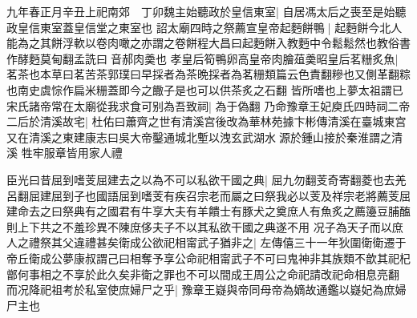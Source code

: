 九年春正月辛丑上祀南郊　丁卯魏主始聽政於皇信東室|{
	自居馮太后之喪至是始聽政皇信東室蓋皇信堂之東室也}
詔太廟四時之祭薦宣皇帝起麪餅鴨|{
	起麪餅今北人能為之其餅浮軟以卷肉噉之亦謂之卷餅程大昌曰起麪餅入教麪中令鬆鬆然也教俗書作酵麪莫甸翻孟詵曰音郝肉羮也}
孝皇后筍鴨卵高皇帝肉膾葅羮昭皇后茗粣炙魚|{
	茗茶也本草曰茗苦茶郭璞曰早採者為茶晩採者為茗粣類篇云色責翻糝也又側革翻粽也南史虞悰作扁米粣蓋即今之饊子是也可以供茶炙之石翻}
皆所嗜也上夢太祖謂已宋氏諸帝常在太廟從我求食可别為吾致祠|{
	為于偽翻}
乃命豫章王妃庾氏四時祠二帝二后於清溪故宅|{
	杜佑曰蕭齊之世有清溪宫後改為華林苑據卞彬傳清溪在臺城東宫又在清溪之東建康志曰吳大帝鑿通城北塹以洩玄武湖水源於鍾山接於秦淮謂之清溪}
牲牢服章皆用家人禮

臣光曰昔屈到嗜芰屈建去之以為不可以私欲干國之典|{
	屈九勿翻芰奇寄翻菱也去羌呂翻屈建屈到子也國語屈到嗜芰有疾召宗老而屬之曰祭我必以芰及祥宗老將薦芰屈建命去之曰祭典有之國君有牛享大夫有羊饋士有豚犬之奠庶人有魚炙之薦籩豆脯醢則上下共之不羞珍異不陳庶侈夫子不以其私欲干國之典遂不用}
况子為天子而以庶人之禮祭其父違禮甚矣衛成公欲祀相甯武子猶非之|{
	左傳僖三十一年狄圍衛衛遷于帝丘衛成公夢康叔謂己曰相奪予享公命祀相甯武子不可曰鬼神非其族類不歆其祀杞鄫何事相之不享於此久矣非衛之罪也不可以間成王周公之命祀請改祀命相息亮翻}
而况降祀祖考於私室使庶婦尸之乎|{
	豫章王嶷與帝同母帝為嫡故通鑑以嶷妃為庶婦尸主也}


